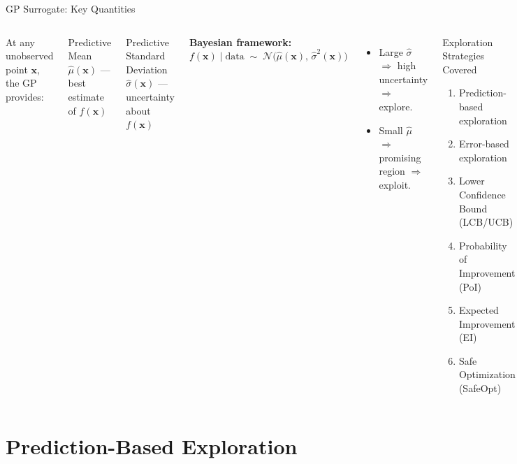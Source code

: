 \documentclass[aspectratio=169,10pt]{beamer}
\begin{document}
\begin{frame}{GP Surrogate: Key Quantities}
  \begin{columns}[T]
      At any unobserved point $\mathbf{x}$, the GP provides:
      \begin{block}{Predictive Mean}
        $\hat{\mu}(\mathbf{x})$ — best estimate of $f(\mathbf{x})$
      \end{block}
      \begin{block}{Predictive Standard Deviation}
        $\hat{\sigma}(\mathbf{x})$ — uncertainty about $f(\mathbf{x})$
      \end{block}
      \vspace{0.4em}
      \textbf{Bayesian framework:}
      \[
        f(\mathbf{x}) \mid \text{data} \;\sim\;
        \mathcal{N}\!\bigl(\hat{\mu}(\mathbf{x}),\,\hat{\sigma}^2(\mathbf{x})\bigr)
      \]
      \vspace{0.4em}
      \begin{itemize}
        \item Large $\hat{\sigma}$ $\Rightarrow$ high uncertainty $\Rightarrow$ explore.
        \item Small $\hat{\mu}$ $\Rightarrow$ promising region $\Rightarrow$ exploit.
      \end{itemize}
      \begin{block}{Exploration Strategies Covered}
        \begin{enumerate}
          \item Prediction-based exploration
          \item Error-based exploration
          \item Lower Confidence Bound (LCB/UCB)
          \item Probability of Improvement (PoI)
          \item Expected Improvement (EI)
          \item Safe Optimization (SafeOpt)
        \end{enumerate}
      \end{block}
  \end{columns}
\end{frame}

\section{Prediction-Based Exploration}
\end{document}
